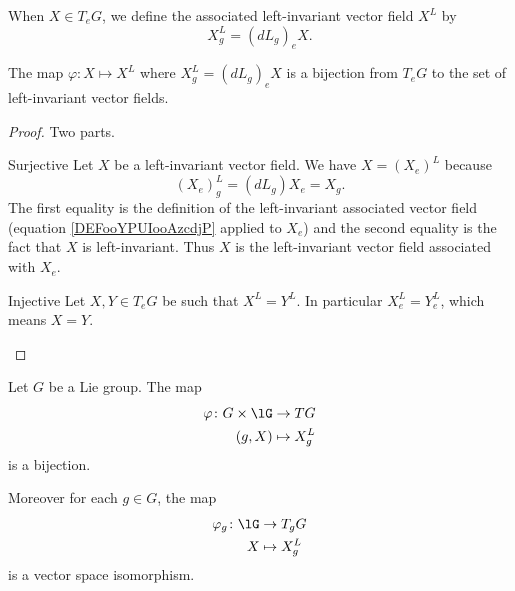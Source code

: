 When \( X\in T_eG\), we define the associated left-invariant vector field \( X^L\) by
\begin{equation}        \label{DEFooYPUIooAzcdjP}
    X^L_g=(dL_g)_eX.
\end{equation}

\begin{theorem}
	The map \( \varphi\colon X\mapsto X^L\) where \( X^L_g=(dL_g)_eX\) is a bijection from \( T_eG\) to the set of left-invariant vector fields.
\end{theorem}

\begin{proof}
    Two parts.
    \begin{subproof}
        \item[Surjective]
            Let \( X\) be a left-invariant vector field. We have \( X=(X_e)^L\) because
            \begin{equation}
                (X_e)^L_g=(dL_g)X_e=X_g.
            \end{equation}
            The first equality is the definition of the left-invariant associated vector field (equation \eqref{DEFooYPUIooAzcdjP} applied to \( X_e\)) and the second equality is the fact that \( X\) is left-invariant. Thus \( X\) is the left-invariant vector field associated with \( X_e\).
        \item[Injective]
            Let \( X,Y\in T_eG\) be such that \( X^L=Y^L\). In particular \( X^L_e=Y^L_e\), which means \( X=Y\).
    \end{subproof}
\end{proof}

\begin{proposition}
    Let \( G\) be a Lie group. The map
    \begin{equation}
        \begin{aligned}
            \varphi\colon G\times \lG&\to TG \\
            (g,X)&\mapsto X^L_g 
        \end{aligned}
    \end{equation}
    is a bijection.

    Moreover for each \( g\in G\), the map
    \begin{equation}
        \begin{aligned}
            \varphi_g\colon \lG&\to T_gG \\
           X&\mapsto X^L_g 
        \end{aligned}
    \end{equation}
    is a vector space isomorphism.
\end{proposition}

